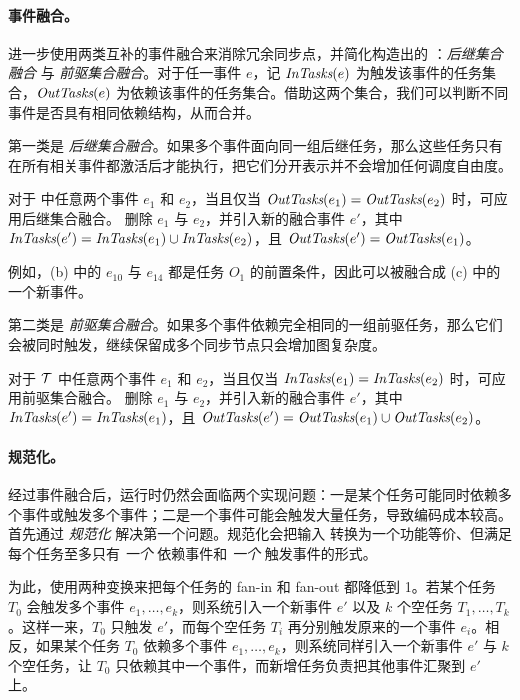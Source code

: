 \paragraph{事件融合。}
\Sys 进一步使用两类互补的事件融合来消除冗余同步点，并简化构造出的 \graph：{\em 后继集合融合} 与 {\em 前驱集合融合}。对于任一事件 $e$，记 $\mbox{\rm\em InTasks}(e)$ 为触发该事件的任务集合，$\mbox{\rm\em OutTasks}(e)$ 为依赖该事件的任务集合。借助这两个集合，我们可以判断不同事件是否具有相同依赖结构，从而合并。

第一类是 {\em 后继集合融合}。如果多个事件面向同一组后继任务，那么这些任务只有在所有相关事件都激活后才能执行，把它们分开表示并不会增加任何调度自由度。

\begin{definition}[后继集合融合]
对于 \graph 中任意两个事件 $e_1$ 和 $e_2$，当且仅当 $\mbox{\rm\em OutTasks}(e_1)=\mbox{\rm\em OutTasks}(e_2)$ 时，可应用后继集合融合。 \Sys 删除 $e_1$ 与 $e_2$，并引入新的融合事件 $e'$，其中 $\mbox{\rm\em InTasks}(e')=\mbox{\rm\em InTasks}(e_1)\cup\mbox{\rm\em InTasks}(e_2)$，且 $\mbox{\rm\em OutTasks}(e')=\mbox{\rm\em OutTasks}(e_1)$。
\end{definition}

例如，(b) 中的 $e_{10}$ 与 $e_{14}$ 都是任务 $O_1$ 的前置条件，因此可以被融合成 (c) 中的一个新事件。

第二类是 {\em 前驱集合融合}。如果多个事件依赖完全相同的一组前驱任务，那么它们会被同时触发，继续保留成多个同步节点只会增加图复杂度。

\begin{definition}[前驱集合融合]
对于 \graph $\cal{T}$ 中任意两个事件 $e_1$ 和 $e_2$，当且仅当 $\mbox{\rm\em InTasks}(e_1)=\mbox{\rm\em InTasks}(e_2)$ 时，可应用前驱集合融合。 \Sys 删除 $e_1$ 与 $e_2$，并引入新的融合事件 $e'$，其中 $\mbox{\rm\em InTasks}(e')=\mbox{\rm\em InTasks}(e_1)$，且 $\mbox{\rm\em OutTasks}(e')=\mbox{\rm\em OutTasks}(e_1)\cup\mbox{\rm\em OutTasks}(e_2)$。
\end{definition}

\paragraph{\graph 规范化。}
经过事件融合后，运行时仍然会面临两个实现问题：一是某个任务可能同时依赖多个事件或触发多个事件；二是一个事件可能会触发大量任务，导致编码成本较高。 \Sys 首先通过 {\em \graph 规范化} 解决第一个问题。规范化会把输入 \graph 转换为一个功能等价、但满足每个任务至多只有 {\em 一个} 依赖事件和 {\em 一个} 触发事件的形式。

为此，\sys 使用两种变换来把每个任务的 fan-in 和 fan-out 都降低到 1。若某个任务 $T_0$ 会触发多个事件 $e_1,\ldots,e_k$，则系统引入一个新事件 $e'$ 以及 $k$ 个空任务 $T_1,\ldots,T_k$。这样一来，$T_0$ 只触发 $e'$，而每个空任务 $T_i$ 再分别触发原来的一个事件 $e_i$。相反，如果某个任务 $T_0$ 依赖多个事件 $e_1,\ldots,e_k$，则系统同样引入一个新事件 $e'$ 与 $k$ 个空任务，让 $T_0$ 只依赖其中一个事件，而新增任务负责把其他事件汇聚到 $e'$ 上。

